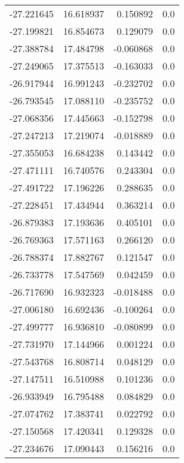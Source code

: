 \begin{tabular}{rrrr}
      -27.221645 &        16.618937 &    0.150892 &   0.0 \\
      -27.199821 &        16.854673 &    0.129079 &   0.0 \\
      -27.388784 &        17.484798 &   -0.060868 &   0.0 \\
      -27.249065 &        17.375513 &   -0.163033 &   0.0 \\
      -26.917944 &        16.991243 &   -0.232702 &   0.0 \\
      -26.793545 &        17.088110 &   -0.235752 &   0.0 \\
      -27.068356 &        17.445663 &   -0.152798 &   0.0 \\
      -27.247213 &        17.219074 &   -0.018889 &   0.0 \\
      -27.355053 &        16.684238 &    0.143442 &   0.0 \\
      -27.471111 &        16.740576 &    0.243304 &   0.0 \\
      -27.491722 &        17.196226 &    0.288635 &   0.0 \\
      -27.228451 &        17.434944 &    0.363214 &   0.0 \\
      -26.879383 &        17.193636 &    0.405101 &   0.0 \\
      -26.769363 &        17.571163 &    0.266120 &   0.0 \\
      -26.788374 &        17.882767 &    0.121547 &   0.0 \\
      -26.733778 &        17.547569 &    0.042459 &   0.0 \\
      -26.717690 &        16.932323 &   -0.018488 &   0.0 \\
      -27.006180 &        16.692436 &   -0.100264 &   0.0 \\
      -27.499777 &        16.936810 &   -0.080899 &   0.0 \\
      -27.731970 &        17.144966 &    0.001224 &   0.0 \\
      -27.543768 &        16.808714 &    0.048129 &   0.0 \\
      -27.147511 &        16.510988 &    0.101236 &   0.0 \\
      -26.933949 &        16.795488 &    0.084829 &   0.0 \\
      -27.074762 &        17.383741 &    0.022792 &   0.0 \\
      -27.150568 &        17.420341 &    0.129328 &   0.0 \\
      -27.234676 &        17.090443 &    0.156216 &   0.0 \\

\end{tabular}
